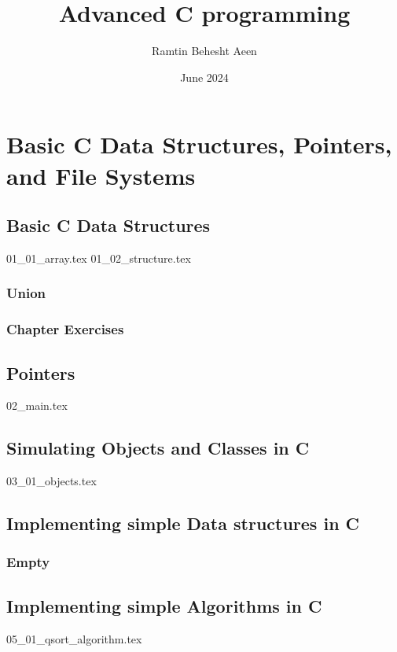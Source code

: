 \documentclass{book}
\title{Advanced C programming}
\author{Ramtin Behesht Aeen}
\date{June 2024}
\begin{document}
\maketitle
\tableofcontents

\part{ Basic C Data Structures, Pointers, and File Systems}
\chapter{Basic C Data Structures}
{01_01_array.tex}
{01_02_structure.tex}
\section{Union}
\section{Chapter Exercises}


\chapter{Pointers}
{02_main.tex}

\chapter{Simulating Objects and Classes in C}
{03_01_objects.tex}

\chapter{Implementing simple Data structures in C}
\section{Empty}

\chapter{Implementing  simple Algorithms in C}
{05_01_qsort_algorithm.tex}
\end{document}
